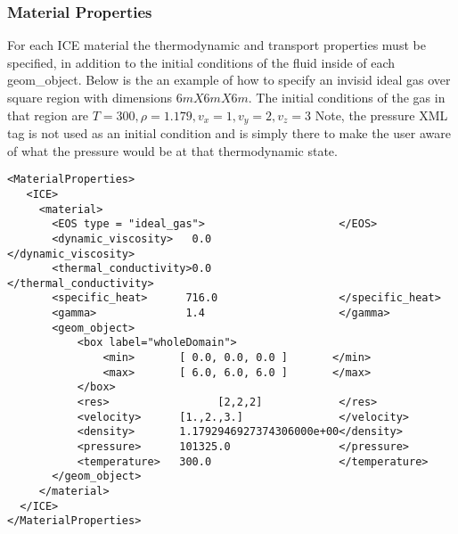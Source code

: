 \subsubsection{Material Properties}
For each ICE material the thermodynamic and transport properties must be
specified, in addition to the initial conditions of the fluid inside of
each geom\_object.  Below is the an example of how to specify an invisid
ideal gas over square region with dimensions $6m X 6m X 6m$.  The initial
conditions of the gas in that region are $T=300, \rho=1.179, v_x=1,v_y=2,
v_z=3$ \big{(}Note, the pressure XML tag is not used as an initial condition
and is simply there to make the user aware of what the pressure would be at
that thermodynamic state.\big{)}
%
\begin{Verbatim}[fontsize=\footnotesize]
<MaterialProperties>
   <ICE>
     <material>
       <EOS type = "ideal_gas">                     </EOS>
       <dynamic_viscosity>   0.0                    </dynamic_viscosity>
       <thermal_conductivity>0.0                    </thermal_conductivity>
       <specific_heat>      716.0                   </specific_heat>
       <gamma>              1.4                     </gamma>
       <geom_object>
           <box label="wholeDomain">
               <min>       [ 0.0, 0.0, 0.0 ]       </min>
               <max>       [ 6.0, 6.0, 6.0 ]       </max>
           </box>
           <res>                 [2,2,2]            </res>
           <velocity>      [1.,2.,3.]               </velocity>
           <density>       1.1792946927374306000e+00</density>
           <pressure>      101325.0                 </pressure>     
           <temperature>   300.0                    </temperature>
       </geom_object>
     </material>
  </ICE>       
</MaterialProperties>
\end{Verbatim}
